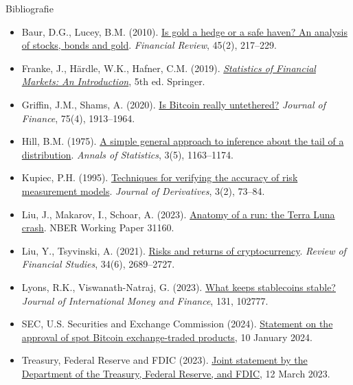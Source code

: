 \begin{frame}{Bibliografie}
\itemsize{\tiny}
\begin{itemize}
    \item Baur, D.G., Lucey, B.M. (2010). \href{https://doi.org/10.1111/j.1540-6288.2010.00244.x}{Is gold a hedge or a safe haven? An analysis of stocks, bonds and gold}. \textit{Financial Review}, 45(2), 217--229.
    \item Franke, J., Härdle, W.K., Hafner, C.M. (2019). \href{https://doi.org/10.1007/978-3-030-13751-9}{\textit{Statistics of Financial Markets: An Introduction}}, 5th ed. Springer.
    \item Griffin, J.M., Shams, A. (2020). \href{https://doi.org/10.1111/jofi.12903}{Is Bitcoin really untethered?} \textit{Journal of Finance}, 75(4), 1913--1964.
    \item Hill, B.M. (1975). \href{https://doi.org/10.1214/aos/1176343247}{A simple general approach to inference about the tail of a distribution}. \textit{Annals of Statistics}, 3(5), 1163--1174.
    \item Kupiec, P.H. (1995). \href{https://doi.org/10.3905/jod.1995.407942}{Techniques for verifying the accuracy of risk measurement models}. \textit{Journal of Derivatives}, 3(2), 73--84.
    \item Liu, J., Makarov, I., Schoar, A. (2023). \href{https://doi.org/10.3386/w31160}{Anatomy of a run: the Terra Luna crash}. NBER Working Paper 31160.
    \item Liu, Y., Tsyvinski, A. (2021). \href{https://doi.org/10.1093/rfs/hhaa113}{Risks and returns of cryptocurrency}. \textit{Review of Financial Studies}, 34(6), 2689--2727.
    \item Lyons, R.K., Viswanath-Natraj, G. (2023). \href{https://doi.org/10.1016/j.jimonfin.2022.102777}{What keeps stablecoins stable?} \textit{Journal of International Money and Finance}, 131, 102777.
    \item SEC, U.S. Securities and Exchange Commission (2024). \href{https://www.sec.gov/newsroom/speeches-statements/gensler-statement-spot-bitcoin-011023}{Statement on the approval of spot Bitcoin exchange-traded products}, 10 January 2024.
    \item Treasury, Federal Reserve and FDIC (2023). \href{https://www.federalreserve.gov/newsevents/pressreleases/monetary20230312b.htm}{Joint statement by the Department of the Treasury, Federal Reserve, and FDIC}, 12 March 2023.
\end{itemize}
\end{frame}


